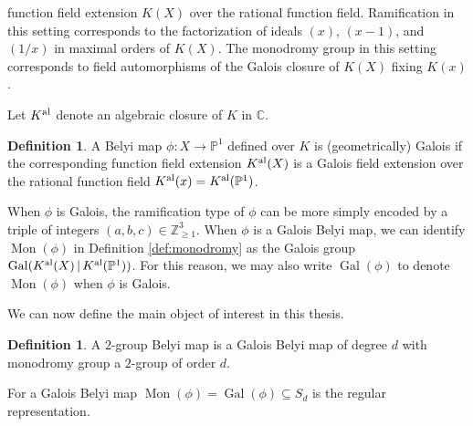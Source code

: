 \documentclass{dcthesis}
\newcommand{\PP}{\mathbb P}
\newcommand{\CC}{\mathbb C}
\newcommand{\ZZ}{\mathbb Z}
\newcommand{\defi}[1]{\textsf{#1}}
\newcommand{\Kal}{{{K}^{\textup{al}}}}
\DeclareMathOperator{\Aut}{Aut}
\DeclareMathOperator{\Mon}{Mon}
\DeclareMathOperator{\Gal}{Gal}
\numberwithin{equation}{section}
\newtheorem{prop}[equation]{Proposition}
\theoremstyle{definition}
\newtheorem{definition}[equation]{Definition}
\theoremstyle{remark}
\begin{document}
{{{    function field extension $K(X)$
    over the rational function field.
    Ramification in this setting corresponds
    to the factorization of ideals
    $(x)$, $(x-1)$, and $(1/x)$
    in maximal orders of $K(X)$.
    The monodromy group in this setting
    corresponds to field automorphisms
    of the Galois closure of $K(X)$
    fixing $K(x)$.
    \par
    Let $\Kal$
    denote an algebraic closure of $K$ in $\CC$.
    \begin{definition}\label{def:galoisbelyi}
      A Belyi map $\phi\colon X\to\PP^1$
      defined over $K$
      is \defi{(geometrically) Galois}
      if the corresponding
      function field extension
      $\Kal(X)$ is a Galois field extension
      over the rational function field
      $\Kal(x)=\Kal(\PP^1)$.
    \end{definition}
    When $\phi$ is Galois,
    the ramification type of
    $\phi$ can be
    more simply encoded by
    a triple of integers
    $(a,b,c)\in\ZZ_{\geq 1}^3$.
    When $\phi$ is a Galois Belyi map,
    we can identify $\Mon(\phi)$
    in Definition \ref{def:monodromy}
    as the Galois group
    $\Gal(\Kal(X)\,|\,\Kal(\PP^1))$.
    For this reason,
    we may also write $\Gal(\phi)$
    to denote $\Mon(\phi)$ when $\phi$
    is Galois.
    \par
    We can now define the main object of
    interest in this thesis.
    \begin{definition}
      \label{def:2gbm}
      A \defi{$2$-group Belyi map}
      is a Galois Belyi map
      of degree $d$
      with monodromy group a
      $2$-group of order $d$.
    \end{definition}
    For a Galois Belyi map
    $\Mon(\phi)=\Gal(\phi)\subseteq S_d$
    is the regular representation.
}}}
\end{document}
